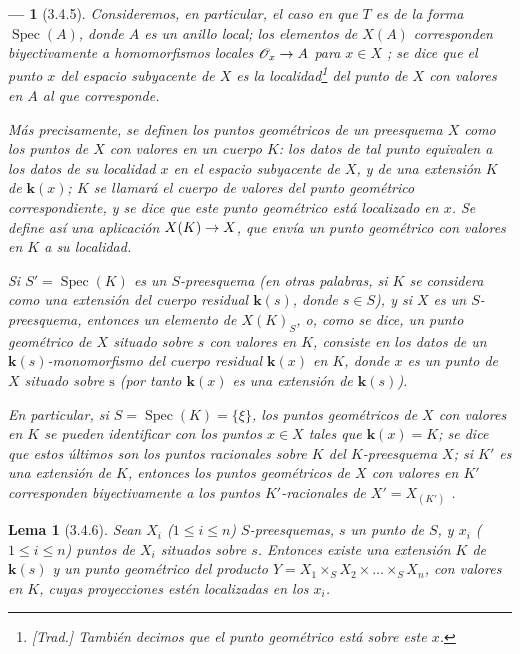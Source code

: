 \documentclass[oneside]{amsart}
\theoremstyle{ega-env-style}
\newtheorem*{env}{---}
\theoremstyle{ega-thm-env-style}
\newtheorem*{lemma}{Lema}
\theoremstyle{ega-defn-env-style}
\def\mathcal{\mathscr}
\def\leq{\leqslant}                 %
\renewcommand{\to}{\mathchoice{\longrightarrow}{\rightarrow}{\rightarrow}{\rightarrow}}
\newcommand{\oldpage}[2][]{{\marginnote{\normalfont{\textbf{#1}~|~#2}}}\ignorespaces}
\let\EGAOriginalLabel\label
\renewcommand{\label}[1]{\phantomsection\EGAOriginalLabel{#1}}
\begin{document}
\begin{env}[3.4.5]
\label{I.3.4.5}
Consideremos, en particular, el caso en que $T$ es de la forma $\operatorname{Spec}(A)$, donde $A$ es un
\emph{anillo local}; los elementos de $X(A)$ corresponden biyectivamente a \emph{homomorfismos
locales} $\mathcal{O}_x\to A$ para $x\in X$ ; se dice que el punto $x$ del espacio
subyacente de $X$ es la \emph{localidad}\footnote{\emph{[Trad.] También decimos que
\emph{el punto geométrico está sobre este $x$}.}} del punto de $X$ con valores en $A$ al que
corresponde.

Más precisamente, se definen los \emph{puntos geométricos} de un preesquema $X$ como los \emph{puntos de
$X$ con valores en un cuerpo $K$}: los datos de tal punto equivalen a los datos de su
\oldpage[I]{113}
localidad $x$ en el espacio subyacente de $X$, y de una \emph{extensión} $K$ de $\boldsymbol{k}(x)$;
$K$ se llamará el \emph{cuerpo de valores} del punto geométrico correspondiente, y se dice que este
punto geométrico está \emph{localizado en $x$}. Se define así una aplicación $X(K)\to X$,
que envía un punto geométrico con valores en $K$ a su localidad.

Si $S'=\operatorname{Spec}(K)$ es un $S$-preesquema (en otras palabras, si $K$ se considera como una extensión
del cuerpo residual $\boldsymbol{k}(s)$, donde $s\in S$), y si $X$ es un $S$-preesquema, entonces un
elemento de $X(K)_S$, o, como se dice, un \emph{punto geométrico de $X$ situado sobre $s$ con valores
en $K$}, consiste en los datos de un $\boldsymbol{k}(s)$-monomorfismo del cuerpo residual $\boldsymbol{k}(x)$
en $K$, donde $x$ es un punto de $X$ \emph{situado sobre} $\mathrm{s}$ (por tanto $\boldsymbol{k}(x)$ es una
extensión de $\boldsymbol{k}(s)$).

En particular, si $S=\operatorname{Spec}(K)=\{\xi\}$, \emph{los puntos geométricos de $X$ con valores en
$K$ se pueden identificar con los puntos $x\in X$ tales que $\boldsymbol{k}(x)=K$}; se dice que estos últimos
son los \emph{puntos racionales sobre $K$ del $K$-preesquema $X$}; si $K'$ es una extensión de
$K$, entonces los puntos geométricos de $X$ con valores en $K'$ corresponden biyectivamente a los
puntos $K'$-racionales de $X'=X_{(K')}$ .
\end{env}

\begin{lemma}[3.4.6]
\label{I.3.4.6}
Sean $X_i$ ($1\leq i\leq n$) $S$-preesquemas, $s$ un punto de $S$, y $x_i$
($1\leq i\leq n$) puntos de $X_i$ situados sobre $s$. Entonces existe una extensión
$K$ de $\boldsymbol{k}(s)$ y un punto geométrico del producto
$Y=X_1\times_S X_2\times\ldots\times_S X_n$, con valores en $K$, cuyas proyecciones estén
localizadas en los $x_i$.
\end{lemma}
\end{document}
